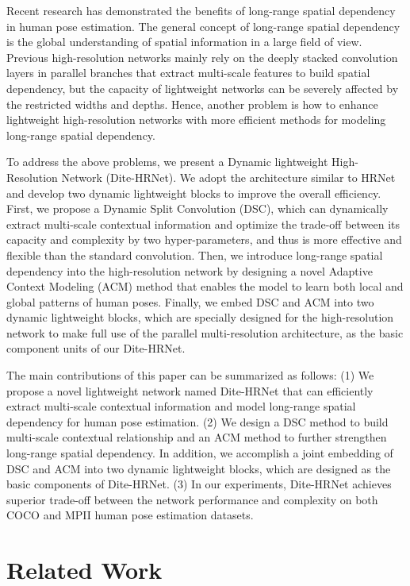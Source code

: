 \documentclass{article}
\begin{document}
Recent research \cite{wang:nonlocal} has demonstrated the benefits of long-range spatial dependency in human pose estimation. The general concept of long-range spatial dependency is the global understanding of spatial information in a large field of view. Previous high-resolution networks \cite{sun:hrnet,cheng:higherhrnet,wang:smallhrnet,yu:litehrnet} mainly rely on the deeply stacked convolution layers in parallel branches that extract multi-scale features to build spatial dependency, but the capacity of lightweight networks can be severely affected by the restricted widths and depths. Hence, another problem is how to enhance lightweight high-resolution networks with more efficient methods for modeling long-range spatial dependency.

To address the above problems, we present a Dynamic lightweight High-Resolution Network (Dite-HRNet). We adopt the architecture similar to HRNet \cite{sun:hrnet} and develop two dynamic lightweight blocks to improve the overall efficiency. First, we propose a Dynamic Split Convolution (DSC), which can dynamically extract multi-scale contextual information and optimize the trade-off between its capacity and complexity by two hyper-parameters, and thus is more effective and flexible than the standard convolution. Then, we introduce long-range spatial dependency into the high-resolution network by designing a novel Adaptive Context Modeling (ACM) method that enables the model to learn both local and global patterns of human poses. Finally, we embed DSC and ACM into two dynamic lightweight blocks, which are specially designed for the high-resolution network to make full use of the parallel multi-resolution architecture, as the basic component units of our Dite-HRNet.

The main contributions of this paper can be summarized as follows: (1) We propose a novel lightweight network named Dite-HRNet that can efficiently extract multi-scale contextual information and model long-range spatial dependency for human pose estimation. (2) We design a DSC method to build multi-scale contextual relationship and an ACM method to further strengthen long-range spatial dependency. In addition, we accomplish a joint embedding of DSC and ACM into two dynamic lightweight blocks, which are designed as the basic components of Dite-HRNet. (3) In our experiments, Dite-HRNet achieves superior trade-off between the network performance and complexity on both COCO and MPII human pose estimation datasets.

\section{Related Work}
\end{document}
